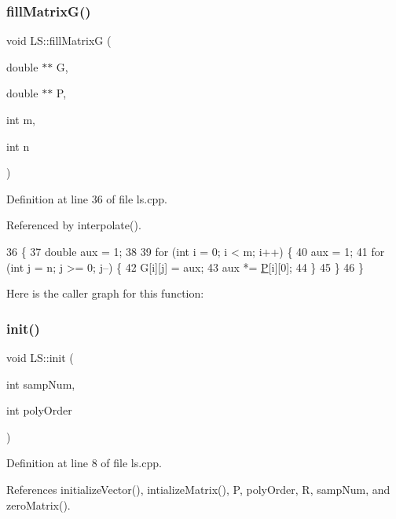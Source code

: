 \subsubsection{\texorpdfstring{fill\+Matrix\+G()}{fillMatrixG()}}
{\footnotesize\ttfamily void L\+S\+::fill\+MatrixG (\begin{DoxyParamCaption}\item[{double $\ast$$\ast$}]{G,  }\item[{double $\ast$$\ast$}]{P,  }\item[{int}]{m,  }\item[{int}]{n }\end{DoxyParamCaption})\hspace{0.3cm}{\ttfamily [private]}}



Definition at line 36 of file ls.\+cpp.



Referenced by interpolate().


\begin{DoxyCode}
36                                                           \{
37     \textcolor{keywordtype}{double} aux = 1;
38 
39     \textcolor{keywordflow}{for} (\textcolor{keywordtype}{int} i = 0; i < m; i++) \{
40         aux = 1;
41         \textcolor{keywordflow}{for} (\textcolor{keywordtype}{int} j = n; j >= 0; j--) \{
42             G[i][j] = aux;
43             aux *= \hyperlink{class_l_s_aef5aafb3950204592111d32c93721aa3}{P}[i][0];
44         \}
45     \}
46 \}
\end{DoxyCode}
Here is the caller graph for this function\+:
\mbox{\label{class_l_s_a8f84bed13c9bf083beac8e5530d8832d}} 
\subsubsection{\texorpdfstring{init()}{init()}}
{\footnotesize\ttfamily void L\+S\+::init (\begin{DoxyParamCaption}\item[{int}]{samp\+Num,  }\item[{int}]{poly\+Order }\end{DoxyParamCaption})}



Definition at line 8 of file ls.\+cpp.



References initialize\+Vector(), intialize\+Matrix(), P, poly\+Order, R, samp\+Num, and zero\+Matrix().



